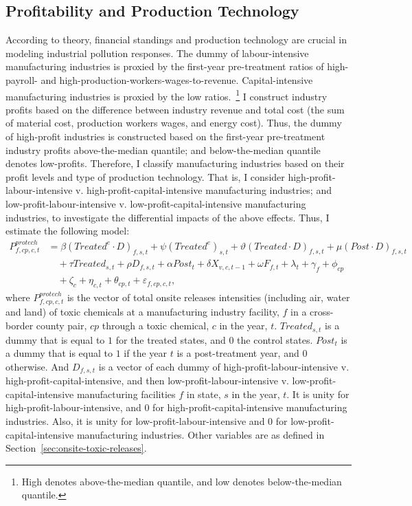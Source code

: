 \documentclass{C:/Users/david/OneDrive/Documents/ULMS/PhD/Thesis/chapter3/src/climate_change/latex/Economic_Journal/OUP-EJ}
\begin{document}
    \subsection{Profitability and Production Technology}\label{subsec:profitability-and-production-technology}
    According to theory, financial standings and production technology are crucial in modeling industrial pollution responses. The dummy of labour-intensive manufacturing industries is proxied by the first-year pre-treatment ratios of high-payroll- and high-production-workers-wages-to-revenue. Capital-intensive manufacturing industries is proxied by the low ratios.~\footnote{High denotes above-the-median quantile, and low denotes below-the-median quantile.} I construct industry profits based on the difference between industry revenue and total cost (the sum of material cost, production workers wages, and energy cost). Thus, the dummy of high-profit industries is constructed based on the first-year pre-treatment industry profits above-the-median quantile; and below-the-median quantile denotes low-profits. Therefore, I classify manufacturing industries based on their profit levels and type of production technology. That is, I consider high-profit-labour-intensive v. high-profit-capital-intensive manufacturing industries; and low-profit-labour-intensive v. low-profit-capital-intensive manufacturing industries, to investigate the differential impacts of the above effects. Thus, I estimate the following model:
    \begin{align}
        P_{f,cp,c,t}^{protech} &= \beta (Treated^{e} \cdot D)_{f,s,t} + \psi (Treated^{e})_{s,t} + \vartheta (Treated \cdot D)_{f,s,t} + \mu (Post \cdot D)_{f,s,t} \nonumber \\
        &\quad + \tau Treated_{s,t} + \rho D_{f,s,t} + \alpha Post_{t} + \delta X_{v,c,t-1} + \omega F_{f,t} + \lambda_{t} + \gamma_{f} + \phi_{cp} \nonumber \\
        &\quad + \zeta_{c} + \eta_{c,t} + \theta_{cp,t} + \varepsilon_{f,cp,c,t},\label{eq:heterogeneous-onsite-releases-intensity-protech}
    \end{align}
    where $P_{f,cp,c,t}^{protech}$ is the vector of total onsite releases intensities (including air, water and land) of toxic chemicals at a manufacturing industry facility, $f$ in a cross-border county pair, $cp$ through a toxic chemical, $c$ in the year, $t$. $Treated_{s,t}$ is a dummy that is equal to $1$ for the treated states, and $0$ the control states. $Post_{t}$ is a dummy that is equal to $1$ if the year $t$ is a post-treatment year, and $0$ otherwise. And $D_{f,s,t}$ is a vector of each dummy of high-profit-labour-intensive v. high-profit-capital-intensive, and then low-profit-labour-intensive v. low-profit-capital-intensive manufacturing facilities $f$ in state, $s$ in the year, $t$. It is unity for high-profit-labour-intensive, and $0$ for high-profit-capital-intensive manufacturing industries. Also, it is unity for low-profit-labour-intensive and $0$ for low-profit-capital-intensive manufacturing industries. Other variables are as defined in Section~\ref{sec:onsite-toxic-releases}.
\end{document}
